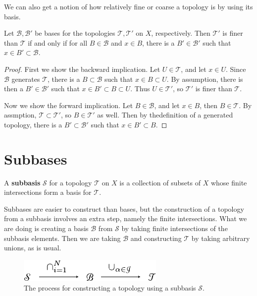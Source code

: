 \documentclass[10pt]{report}
\begin{document}
We can also get a notion of how relatively fine or coarse a topology is by using its basis.

\begin{prop}
	Let $\mathcal{B}, \mathcal{B}'$ be bases for the topologies $\mathcal{T},\mathcal{T}'$ on $X$, respectively. Then $\mathcal{T}'$ is finer than $\mathcal{T}$ if and only if for all $B \in \mathcal{B}$ and $x \in B$, there is a $B' \in \mathcal{B}'$ such that $x \in B' \subset \mathcal{B}$.
\end{prop}
\begin{proof}
	First we show the backward implication. Let $U \in \mathcal{T}$, and let $x \in U$. Since $\mathcal{B}$ generates $\mathcal{T}$, there is a $B \subset \mathcal{B}$ such that $x \in B \subset U$. By assumption, there is then a $B' \in \mathcal{B}'$ such that $x \in B' \subset B \subset U$. Thus $U \in \mathcal{T}'$, so $\mathcal{T}'$ is finer than $\mathcal{T}$.

	Now we show the forward implication. Let $B \in \mathcal{B}$, and let $x \in B$, then $B \in \mathcal{T}$. By assmption, $\mathcal{T} \subset \mathcal{T}'$, so $B \in \mathcal{T}'$ as well. Then by thedefinition of a generated topology, there is a $B' \subset \mathcal{B}'$ such that $x \in B' \subset B$.
\end{proof}


\section{Subbases}

\begin{defn}
	A \textbf{subbasis} $\mathcal{S}$ for a topology $\mathcal{T}$ on $X$ is a collection of subsets of $X$ whose finite intersections form a basis for $\mathcal{T}$.
\end{defn}

Subbases are easier to construct than bases, but the construction of a topology from a subbasis involves an extra step, namely the finite intersections. What we are doing is creating a basis $\mathcal{B}$ from $\mathcal{S}$ by taking finite intersections of the subbasis elements. Then we are taking $\mathcal{B}$ and constructing $\mathcal{T}$ by taking arbitrary unions, as is usual.

\begin{figure}[H]
	\centering
	\includegraphics[scale=1]{fig/subbasis-to-topology.pdf}
	\caption{The process for constructing a topology using a subbasis $\mathcal{S}$.}
\end{figure}
\end{document}
